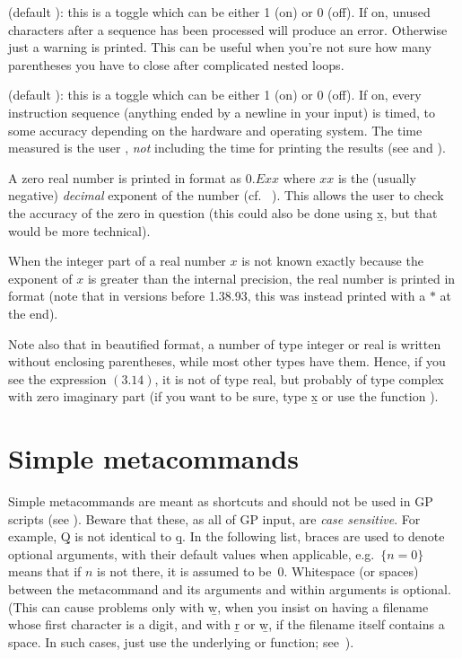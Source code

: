  (default ): this is a toggle which can be
either 1 (on) or 0 (off). If on, unused characters after a sequence has been
processed will produce an error. Otherwise just a warning is printed. This
can be useful when you're not sure how many parentheses you have to close after
complicated nested loops.

 (default ): this is a toggle which can be either 1
(on) or 0 (off). If on, every instruction sequence (anything ended by a
newline in your input) is timed, to some accuracy depending on the hardware
and operating system. The time measured is the user ,
\emph{not} including the time for printing the results (see \kbd{\#} and
\kbd{\#\#}).


\noindent
A zero real number is printed in  format as $0.Exx$ where $xx$ is
the (usually negative) \emph{decimal} exponent of the number (cf.\ %
). This allows the user to check the accuracy of the zero
in question (this could also be done using \b{x}, but that would be more
technical).

When the integer part of a real number $x$ is not known exactly because the
exponent of $x$ is greater than the internal precision, the real number is
printed in  format (note that in versions before 1.38.93, this was
instead printed with a $*$ at the end).

Note also that in beautified format, a number of type integer or real is
written without enclosing parentheses, while most other types have them.
Hence, if you see the expression $( 3.14 )$, it is not of type real, but
probably of type complex with zero imaginary part (if you want to be sure, type
\b{x} or use the function ).

\section{Simple metacommands}\label{se:meta}

\noindent
Simple metacommands are meant as shortcuts and should not be used in GP
scripts (see ). Beware that these, as all of GP input,
are \emph{case sensitive}. For example, \b{Q} is not identical to \b{q}. In
the following list, braces are used to denote optional arguments, with their
default values when applicable, e.g.~$\{n=0\}$ means that if $n$ is not
there, it is assumed to be~$0$. Whitespace (or spaces) between the
metacommand and its arguments and within arguments is optional. (This can
cause problems only with \b{w}, when you insist on having a filename whose
first character is a digit, and with \b{r} or \b{w}, if the filename itself
contains a space. In such cases, just use the underlying  or
 function; see~).

